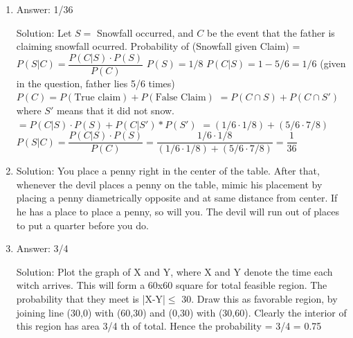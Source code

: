 \begin{enumerate}

\item
Answer: 1/36
 
Solution: Let $S =$ Snowfall occurred, and $C$ be the event that the father is claiming snowfall ocurred.
Probability of (Snowfall given Claim) = $P(S | C) = \dfrac{P(C|S) \cdot P(S)}{P(C)}$
$P(S) = 1/8$
$P(C|S) =1 - 5/6 = 1/6$ (given in the question, father lies 5/6 times)
$P(C) = P(\text{True claim}) + P(\text{False Claim})$
$= P(C \cap S) + P(C \cap S')$  where $S'$ means that it did not snow.
$= P(C|S) \cdot P(S) + P( C | S') * P(S')$
$= (1/6 \cdot 1/8) + (5/6 \cdot 7/8)$
$P(S | C) = \dfrac{P(C|S) \cdot P(S)}{P(C)} = \dfrac{1/6 \cdot 1/8}{(1/6 \cdot 1/8) + (5/6 \cdot 7/8)} = \dfrac{1}{36}$




\item
Solution: You place a penny right in the center of the table. After that, whenever the devil places a penny on the table, mimic his placement by placing a penny diametrically opposite and at same distance from center. If he has a place to place a penny, so will you. The devil will run out of places to put a quarter before you do.




\item
Answer: 3/4
 
Solution: Plot the graph of X and Y, where X and Y denote the time each witch arrives. This will form a 60x60 square for total feasible region. The probability that they meet is |X-Y|$\le$ 30. Draw this as favorable region, by joining line (30,0) with (60,30) and (0,30) with (30,60). Clearly the interior of this region has area 3/4 th of total. Hence the probability = 3/4 = 0.75





\end{enumerate}

